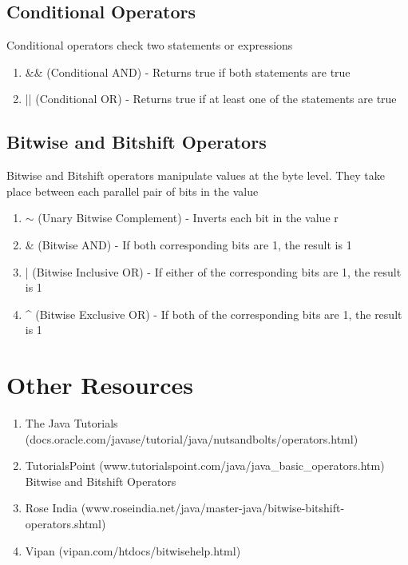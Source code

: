 \documentclass[a4paper]{article}
\begin{document}
\subsection*{Conditional Operators}
Conditional operators check two statements or expressions
\begin{enumerate}

\item \&\& (Conditional AND) - Returns true if both statements are true

\item || (Conditional OR) - Returns true if at least one of the statements are true

\end{enumerate}

\subsection*{Bitwise and Bitshift Operators}
Bitwise and Bitshift operators manipulate values at the byte level. They take place between each parallel pair of bits in the value
\begin{enumerate}

\item $\sim$ (Unary Bitwise Complement) - Inverts each bit in the value
r

\item \& (Bitwise AND) - If both corresponding bits are 1, the result is 1

\item | (Bitwise Inclusive OR) - If either of the corresponding bits are 1, the result is 1

\item \string^ (Bitwise Exclusive OR) - If both of the corresponding bits are 1, the result is 1

\end{enumerate}


\newpage

\section*{Other Resources}
\begin{enumerate}

\item The Java Tutorials (docs.oracle.com/javase/tutorial/java/nutsandbolts/operators.html)

\item TutorialsPoint (www.tutorialspoint.com/java/java\_basic\_operators.htm) \\ 

Bitwise and Bitshift Operators

\item Rose India (www.roseindia.net/java/master-java/bitwise-bitshift-operators.shtml)

\item Vipan (vipan.com/htdocs/bitwisehelp.html)

\end{enumerate}
\end{document}
